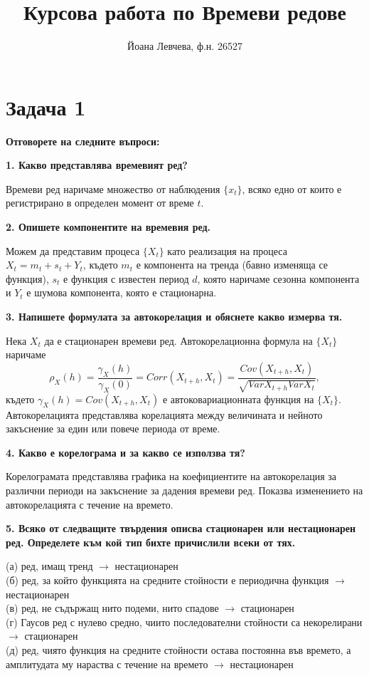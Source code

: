 \documentclass{article}
\title{Курсова работа по Времеви редове}
\author{Йоана Левчева, ф.н. 26527}
\begin{document}
\maketitle

\section*{Задача 1}
\textbf{Отговорете на следните въпроси:}
\begin{flushleft}

\textbf{1. Какво представлява времевият ред?}
\begin{flushleft}
Времеви ред наричаме множество от наблюдения $\{ x_t \}$, всяко едно от които е регистрирано в определен момент от време $t$.
\end{flushleft}

\textbf{2. Опишете компонентите на времевия ред.}
\begin{flushleft}
Можем да представим процеса $\{X_t \}$ като реализация на процеса $X_t = m_t + s_t + Y_t$, където $m_t$ е компонента на тренда (бавно изменяща се функция), $s_t$ е функция с известен период $d$, която наричаме сезонна компонента и $Y_t$ е шумова компонента, която е стационарна.
\end{flushleft}

\textbf{3. Напишете формулата за автокорелация и обяснете какво измерва тя.}
\begin{flushleft}
Нека $X_t$ да е стационарен времеви ред. Автокорелационна формула на $\{X_t \}$ наричаме $$\rho_{X}(h) = \frac{\gamma_{X}(h)}{\gamma_{X}(0)} = Corr(X_{t+h}, X_t) = \frac{Cov(X_{t+h}, X_t)}{\sqrt{Var X_{t+h}Var X_t}},$$ където $\gamma_{X}(h) = Cov(X_{t+h}, X_t)$ е автоковариационната функция на $\{ X_t \}$. Автокорелацията представлява корелацията между величината и нейното закъснение за един или повече периода от време.
\end{flushleft}

\textbf{4. Какво е корелограма и за какво се използва тя?}
\begin{flushleft}
Корелограмата представлява графика на коефициентите на автокорелация за различни периоди на закъснение за дадения времеви ред. Показва изменението на автокорелацията с течение на времето. 
\end{flushleft}

\textbf{5. Всяко от следващите твърдения описва стационарен или нестационарен ред. Определете към кой тип бихте причислили всеки от тях.}
\begin{flushleft}
(а) ред, имащ тренд $\rightarrow$ нестационарен \\
(б) ред, за който функцията на средните стойности е периодична функция $\rightarrow$ нестационарен \\
(в) ред, не съдържащ нито подеми, нито спадове $\rightarrow$ стационарен \\
(г) Гаусов ред с нулево средно, чиито последователни стойности са некорелирани $\rightarrow$ стационарен \\
(д) ред, чиято функция на средните стойности остава постоянна във времето, а амплитудата му нараства с течение на времето $\rightarrow$ нестационарен
\end{flushleft}


\end{flushleft}
\end{document}
